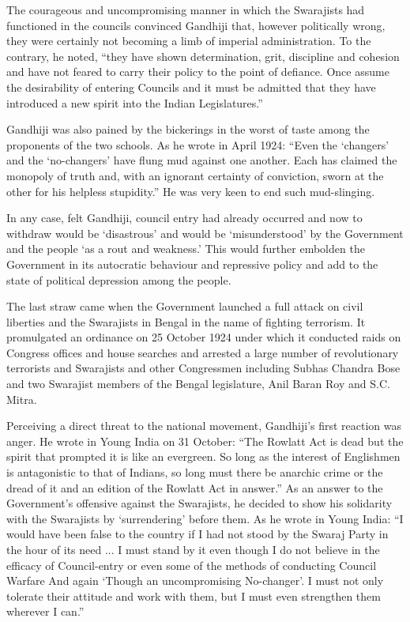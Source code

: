 \begin{multicols}{2}
The courageous and uncompromising manner in which the Swarajists had functioned in the councils convinced Gandhiji that, however politically wrong, they were certainly not becoming a limb of imperial administration. To the contrary, he noted, ``they have shown determination, grit, discipline and cohesion and have not feared to carry their policy to the point of defiance. Once assume the desirability of entering Councils and it must be admitted that they have introduced a new spirit into the Indian Legislatures.''

Gandhiji was also pained by the bickerings in the worst of taste among the proponents of the two schools. As he wrote in April 1924: ``Even the `changers' and the `no-changers' have flung mud against one another. Each has claimed the monopoly of truth and, with an ignorant certainty of conviction, sworn at the other for his helpless stupidity.'' He was very keen to end such mud-slinging.

In any case, felt Gandhiji, council entry had already occurred and now to withdraw would be `disastrous' and would be `misunderstood' by the Government and the people `as a rout and weakness.' This would further embolden the Government in its autocratic behaviour and repressive policy and add to the state of political depression among the people.

The last straw came when the Government launched a full attack on civil liberties and the Swarajists in Bengal in the name of fighting terrorism. It promulgated an ordinance on 25 October 1924 under which it conducted raids on Congress offices and house searches and arrested a large number of revolutionary terrorists and Swarajists and other Congressmen including Subhas Chandra Bose and two Swarajist members of the Bengal legislature, Anil Baran Roy and S.C. Mitra.

Perceiving a direct threat to the national movement, Gandhiji's first reaction was anger. He wrote in Young India on 31 October: ``The Rowlatt Act is dead but the spirit that prompted it is like an evergreen. So long as the interest of Englishmen is antagonistic to that of Indians, so long must there be anarchic crime or the dread of it and an edition of the Rowlatt Act in answer.'' As an answer to the Government's offensive against the Swarajists, he decided to show his solidarity with the Swarajists by `surrendering' before them. As he wrote in Young India: ``I would have been false to the country if I had not stood by the Swaraj Party in the hour of its need ... I must stand by it even though I do not believe in the efficacy of Council-entry or even some of the methods of conducting Council Warfare And again `Though an uncompromising No-changer'. I must not only tolerate their attitude and work with them, but I must even strengthen them wherever I can.''


\end{multicols}

